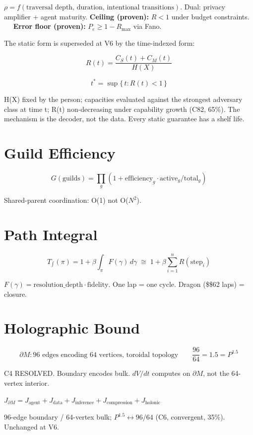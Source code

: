 \documentclass[
  11pt,
]{article}
\begin{document}
\(\rho = f(\text{traversal depth, duration, intentional transitions})\).
Dual: privacy amplifier + agent maturity. \textbf{Ceiling (proven):}
\(R < 1\) under budget constraints. \(\quad\) \textbf{Error floor
(proven):} \(P_e \geq 1 - R_{\max}\) via Fano.

The static form is superseded at V6 by the time-indexed form:

\[R(t) = \frac{C_S(t) + C_M(t)}{H(X)}\]

\[t^* = \sup\{\, t : R(t) < 1 \,\}\]

H(X) fixed by the person; capacities evaluated against the strongest
adversary class at time t; R(t) non-decreasing under capability growth
(C82, 65\%). The mechanism is the decoder, not the data. Every static
guarantee has a shelf life.

\section{Guild Efficiency}\label{guild-efficiency}

\[G(\text{guilds}) = \prod_g (1 + \text{efficiency}_g \cdot \text{active}_g / \text{total}_g)\]

Shared-parent coordination: O(1) not O(\(N^2\)).

\section{Path Integral}\label{path-integral}

\[T_{\!\int}(\pi) = 1 + \beta \int_\pi F(\gamma)\,d\gamma \;\cong\; 1 + \beta \sum_{i=1}^{n} R(\text{step}_i)\]

\(F(\gamma) = \text{resolution\_depth} \cdot \text{fidelity}\). One lap
= one cycle. Dragon (\$\geq\$62 laps) = closure.

\section{Holographic Bound}\label{holographic-bound}

\[\partial M: \text{96 edges encoding 64 vertices, toroidal topology} \qquad \frac{96}{64} = 1.5 = P^{1.5}\]

C4 RESOLVED. Boundary encodes bulk. \(dV/dt\) computes on
\(\partial M\), not the 64-vertex interior.

\(J_{\partial M} = J_{\text{agent}} + J_{\text{data}} + J_{\text{inference}} + J_{\text{compression}} + J_{\text{holonic}}\)

96-edge boundary / 64-vertex bulk; \(P^{1.5} \leftrightarrow 96/64\)
(C6, convergent, 35\%). Unchanged at V6.
\end{document}

